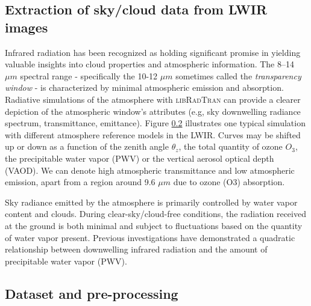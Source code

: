 \documentclass[remotesensing,article,submit,pdftex,moreauthors]{Definitions/mdpi}
\begin{document}
\subsection{Extraction of sky/cloud data from LWIR images}

Infrared radiation has been recognized as holding significant promise in yielding valuable insights into cloud properties and atmospheric information. The 8–14 $\mu m$ spectral range - specifically the 10-12 $\mu m$ sometimes called the \textit{transparency window} - is characterized by minimal atmospheric emission and absorption. Radiative simulations of the atmosphere with \textsc{libRadTran} can provide a clearer depiction of the atmospheric window's attributes (e.g, sky downwelling radiance spectrum, transmittance, emittance). Figure \ref{} illustrates one typical simulation with different atmosphere reference models in the LWIR. Curves may be shifted up or down as a function of the zenith angle $\theta_{z}$, the total quantity of ozone $O_{3}$, the precipitable water vapor (PWV) or the vertical aerosol optical depth (VAOD). We can denote high atmospheric transmittance and low atmospheric emission, apart from a region around 9.6 $\mu m$ due to ozone (O3) absorption.

Sky radiance emitted by the atmosphere is primarily controlled by water vapor content and clouds. During clear-sky/cloud-free conditions, the radiation received at the ground is both minimal and subject to fluctuations based on the quantity of water vapor present. Previous investigations have demonstrated a quadratic relationship between downwelling infrared radiation and the amount of precipitable water vapor (PWV). 

\subsection{Dataset and pre-processing}
\end{document}
